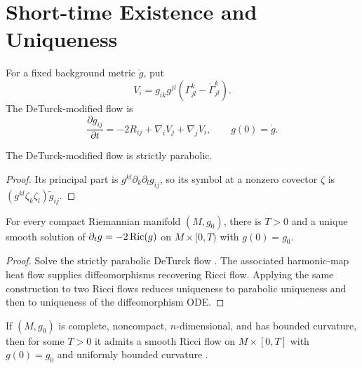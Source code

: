 \section{Short-time Existence and Uniqueness}

For a fixed background metric $\mathring g$, put
\[
V_i=g_{ik}g^{jl}(\Gamma^k_{jl}-\mathring\Gamma^k_{jl}).
\]
The DeTurck-modified flow \cite{De} is
\[
\frac{\partial g_{ij}}{\partial t}=-2R_{ij}+\nabla_iV_j+\nabla_jV_i,
\qquad g(0)=\mathring g.
\]

\begin{lemma}
  \label{lem:cz-strict-parabolicity-of-the-deturck-modified-flow}
The DeTurck-modified flow is strictly parabolic.
\end{lemma}
\begin{proof}
\sketch Its principal part is $g^{kl}\partial_k\partial_lg_{ij}$,
so its symbol at a nonzero covector $\zeta$ is
$(g^{kl}\zeta_k\zeta_l)\widetilde g_{ij}$.
\end{proof}

\begin{theorem}
  \label{thm:cz-short-time-existence-and-uniqueness-on-compact-manifolds}
For every compact Riemannian manifold $(M,g_0)$, there is $T>0$ and
a unique smooth solution of $\partial_tg=-2\operatorname{Ric}(g)$ on
$M\times[0,T)$ with $g(0)=g_0$.
\end{theorem}
\begin{proof}
\sketch Solve the strictly parabolic DeTurck flow \cite{Ha82, De}.  The associated
harmonic-map heat flow supplies diffeomorphisms recovering Ricci flow.
Applying the same construction to two Ricci flows reduces uniqueness to
parabolic uniqueness and then to uniqueness of the diffeomorphism ODE.
\end{proof}

\begin{theorem}
  \label{thm:cz-short-time-existence-on-complete-noncompact-manifolds}
If $(M,g_0)$ is complete, noncompact, $n$-dimensional, and has bounded
curvature, then for some $T>0$ it admits a smooth Ricci flow on
$M\times[0,T]$ with $g(0)=g_0$ and uniformly bounded curvature
\cite{Sh89}.
\end{theorem}

